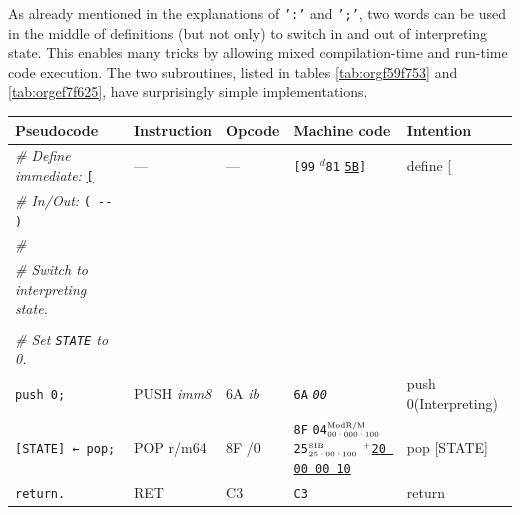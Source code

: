 \documentclass[a4paper,12pt,final]{article}
\begin{document}
\begin{table}[!htbp]
\begin{adjustwidth}{-1cm}{-1cm}
\begin{center}
\end{center}
\normalsize \end{adjustwidth} \end{table} \vspace{0}

As already mentioned in the explanations of \texttt{':'} and \texttt{';'}, two words
can be used in the middle of definitions (but not only) to switch in
and out of interpreting state.  This enables many tricks by allowing
mixed compilation-time and run-time code execution.  The two
subroutines, listed in tables \ref{tab:orgf59f753} and
\ref{tab:orgef7f625}, have surprisingly simple implementations.

\begin{table}[!htbp] \begin{adjustwidth}{-1cm}{-1cm} \fontsize{10}{12.000000}\selectfont
\begin{center}
\begin{tabular}{l|ll|lH}
\textbf{Pseudocode} & \textbf{Instruction} & \textbf{Opcode} & \textbf{Machine code} & \textbf{Intention}\\[0pt]
\hline
\emph{\# Define immediate:} \uline{\texttt{[}} & --- & --- & \texttt{[99} \(^{d}\)​\texttt{81} \uline{\texttt{5B}}​\texttt{]} & define [\\[0pt]
\emph{\# In/Out:} \texttt{( -​- )} &  &  &  & \\[0pt]
\emph{\#} &  &  &  & \\[0pt]
\emph{\# Switch to interpreting state.} &  &  &  & \\[0pt]
 &  &  &  & \\[0pt]
\emph{\# Set \texttt{STATE} to 0.} &  &  &  & \\[0pt]
\texttt{push 0;} & PUSH \emph{imm8} & 6A \emph{ib} & \texttt{6A} \emph{\texttt{00}} & push 0(Interpreting)\\[0pt]
\texttt{[STATE] ← pop;} & POP r/m64 & 8F /0 & \texttt{8F} \texttt{04}​\(^{\text{\tiny ModR/M}}_{\text{\tiny 00·000·100}}\) \texttt{25}​\(^{\text{\tiny    SIB}}_{\text{\tiny 25·00·100}}\) \(^{\text{\tiny +}}\)​\uline{\texttt{20 00 00 10}} & pop [STATE]\\[0pt]
\texttt{return.} & RET & C3 & \texttt{C3} & return\\[0pt]
\end{tabular}
\captionof{table}{\label{tab:orgf59f753}Subroutine \texttt{'['} changes Forth's \texttt{STATE} to interpreting (x86-64).}

\end{center}
\normalsize \end{adjustwidth} \end{table} \vspace{0}
\end{document}

